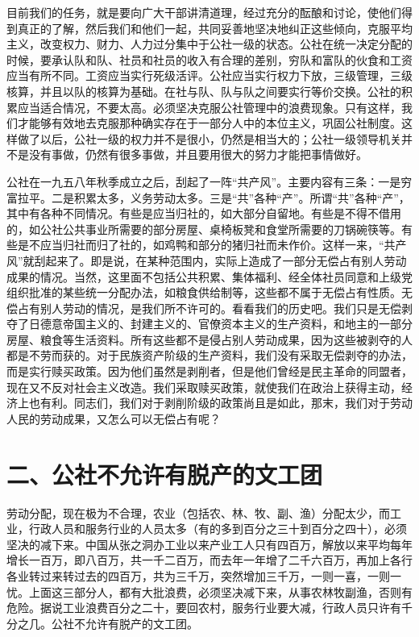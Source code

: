 目前我们的任务，就是要向广大干部讲清道理，经过充分的酝酿和讨论，使他们得到真正的了解，然后我们和他们一起，共同妥善地坚决地纠正这些倾向，克服平均主义，改变权力、财力、人力过分集中于公社一级的状态。公社在统一决定分配的时候，要承认队和队、社员和社员的收入有合理的差别，穷队和富队的伙食和工资应当有所不同。工资应当实行死级活评。公社应当实行权力下放，三级管理，三级核算，并且以队的核算为基础。在社与队、队与队之间要实行等价交换。公社的积累应当适合情况，不要太高。必须坚决克服公社管理中的浪费现象。只有这样，我们才能够有效地去克服那种确实存在于一部分人中的本位主义，巩固公社制度。这样做了以后，公社一级的权力并不是很小，仍然是相当大的；公社一级领导机关并不是没有事做，仍然有很多事做，并且要用很大的努力才能把事情做好。

公社在一九五八年秋季成立之后，刮起了一阵“共产风”。主要内容有三条：一是穷富拉平。二是积累太多，义务劳动太多。三是“共”各种“产”。所谓“共”各种“产”，其中有各种不同情况。有些是应当归社的，如大部分自留地。有些是不得不借用的，如公社公共事业所需要的部分房屋、桌椅板凳和食堂所需要的刀锅碗筷等。有些是不应当归社而归了社的，如鸡鸭和部分的猪归社而未作价。这样一来，“共产风”就刮起来了。即是说，在某种范围内，实际上造成了一部分无偿占有别人劳动成果的情况。当然，这里面不包括公共积累、集体福利、经全体社员同意和上级党组织批准的某些统一分配办法，如粮食供给制等，这些都不属于无偿占有性质。无偿占有别人劳动的情况，是我们所不许可的。看看我们的历史吧。我们只是无偿剥夺了日德意帝国主义的、封建主义的、官僚资本主义的生产资料，和地主的一部分房屋、粮食等生活资料。所有这些都不是侵占别人劳动成果，因为这些被剥夺的人都是不劳而获的。对于民族资产阶级的生产资料，我们没有采取无偿剥夺的办法，而是实行赎买政策。因为他们虽然是剥削者，但是他们曾经是民主革命的同盟者，现在又不反对社会主义改造。我们采取赎买政策，就使我们在政治上获得主动，经济上也有利。同志们，我们对于剥削阶级的政策尚且是如此，那末，我们对于劳动人民的劳动成果，又怎么可以无偿占有呢？

\date{一九五九年二月二十八日}
\section{二、公社不允许有脱产的文工团}

劳动分配，现在极为不合理，农业（包括农、林、牧、副、渔）分配太少，而工业，行政人员和服务行业的人员太多（有的多到百分之三十到百分之四十），必须坚决的减下来。中国从张之洞办工业以来产业工人只有四百万，解放以来平均每年增长一百万，即八百万，共一千二百万，而去年一年增了二千六百万，再加上各行各业转过来转过去的四百万，共为三千万，突然增加三千万，一则一喜，一则一忧。上面这三部分人，都有大批浪费，必须坚决减下来，从事农林牧副渔，否则有危险。据说工业浪费百分之二十，要回农村，服务行业要大减，行政人员只许有千分之几。公社不允许有脱产的文工团。

